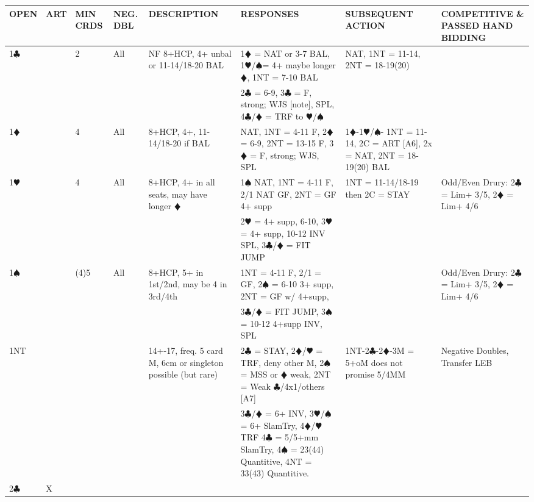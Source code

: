 \documentclass{article}
\newcommand\C{\ensuremath{\clubsuit}}
\newcommand\D{\color{red}\ensuremath{\vardiamondsuit}}
\renewcommand\H{\color{red}\ensuremath{\varheartsuit}}
\renewcommand\S{\ensuremath{\spadesuit}}
\newcommand\N{{\footnotesize NT}}
\begin{document}
\noindent
\begin{tabular}{| p{9mm} | p{6mm} | p{6mm} | p{6mm} | p{58mm} | p{62mm} | p{58mm} | p{48mm} |}
	\hline
	\cellcolor{green!25} \textbf{OPEN} & \cellcolor{green!25} \textbf{ART} & \cellcolor{green!25} \textbf{MIN CRDS} & \cellcolor{green!25} \textbf{NEG. DBL} & \cellcolor{green!25} \textbf{DESCRIPTION} & \cellcolor{green!25} \textbf{RESPONSES} & \cellcolor{green!25} \textbf{SUBSEQUENT ACTION} & \cellcolor{green!25} \textbf{COMPETITIVE \& PASSED HAND BIDDING} \\ \hline
	1\C & & 2 & All
			& NF 8+HCP, 4+ unbal or 11-14/18-20 BAL
			& 1{\D} = NAT or 3-7 BAL, 1{\H}/{\S}= 4+ maybe longer {\D}, 1NT = 7-10 BAL 
			& NAT, 1NT = 11-14, 2NT = 18-19(20)
			& \\ \hline
	& & & & & 2{\C} = 6-9, 3{\C} = F, strong; WJS [note], SPL, 4{\C}/{\D} = TRF to {\H}/{\S}& & \\ \hline
	1\D & & 4 & All 
			& 8+HCP, 4+, 11-14/18-20 if BAL 
			& NAT, 1NT = 4-11 F, 2{\D} = 6-9, 2{\N} = 13-15 F, 3{\D} = F, strong; WJS, SPL
			& 1{\D}-1{\H}/{\S}- 1NT = 11-14, 2C = ART [A6], 2x = NAT, 2NT = 18-19(20) BAL & \\ \hline
	1\H & & 4 & All 
			& 8+HCP, 4+ in all seats, may have longer {\D}
			& 1{\S} NAT, 1NT = 4-11 F, 2/1 NAT GF, 2NT = GF 4+ supp 
			& 1NT = 11-14/18-19 then 2C = STAY
			& Odd/Even Drury: 2{\C} = Lim+ 3/5, 2{\D} = Lim+ 4/6\\ \hline
	& & & & & 2{\H} = 4+ supp, 6-10, 3{\H} = 4+ supp, 10-12 INV 
			SPL, 3{\C}/{\D} = FIT JUMP& & \\ \hline
	1\S & & (4)5 & All 
			& 8+HCP, 5+ in 1st/2nd, may be 4 in 3rd/4th 
			& 1NT = 4-11 F, 2/1 = GF, 2{\S} = 6-10 3+ supp,
			2NT = GF w/ 4+supp,
			& 
			& Odd/Even Drury: 2{\C} = Lim+ 3/5, 2{\D} = Lim+ 4/6\\ \hline
	& & & & &  3{\C}/{\D} = FIT JUMP, 3{\S} = 10-12 4+supp INV, SPL& & \\ \hline
	1\N & & & & 14+-17, freq. 5 card M, 6cm or singleton possible (but rare)
			& 2{\C} = STAY, 2{\D}/{\H} = TRF, deny other M, 2{\S} = MSS or {\D} weak, 2{\N} = Weak {\C}/4x1/others [A7]
			& 1{\N}-2{\C}-2{\D}-3M = 5+oM does not promise 5/4MM
			& Negative Doubles, Transfer LEB\\ \hline
	& & & & & 3{\C}/{\D} = 6+ INV, 3{\H}/{\S} = 6+ SlamTry, 4{\D}/{\H} TRF
			4{\C} = 5/5+mm SlamTry, 4{\S} = 23(44) Quantitive, 4{\N} = 33(43) Quantitive.
			& & \\ \hline
	2\C & X & & 

\end{tabular}
\end{document}
